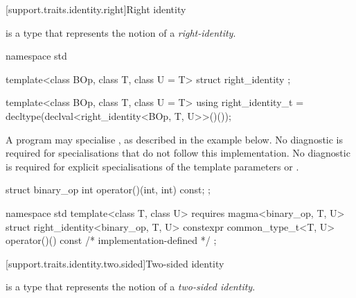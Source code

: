 [support.traits.identity.right]{Right identity}

\pnum
{} is a type that represents the notion of a \textit{right-identity}.

\begin{itemdecl}
namespace std {
  template<class BOp, class T, class U = T>
  struct right_identity {};

  template<class BOp, class T, class U = T>
  using right_identity_t = decltype(declval<right_identity<BOp, T, U>>()());
}
\end{itemdecl}
\begin{itemdescr}
   \pnum
   A program may specialise , as described in the example below. No diagnostic
   is required for specialisations that do not follow this implementation. No diagnostic is required
   for explicit specialisations of the template parameters  or .
\begin{example}
\begin{codeblock}
struct binary_op {
  int operator()(int, int) const;
};

namespace std {
  template<class T, class U>
  requires magma<binary_op, T, U>
  struct right_identity<binary_op, T, U> {
    constexpr common_type_t<T, U> operator()() const
    { /* implementation-defined */ }
  };
}
\end{codeblock}
\end{example}
\end{itemdescr}

[support.traits.identity.two.sided]{Two-sided identity}

\pnum
{} is a type that represents the notion of a \textit{two-sided identity}.

